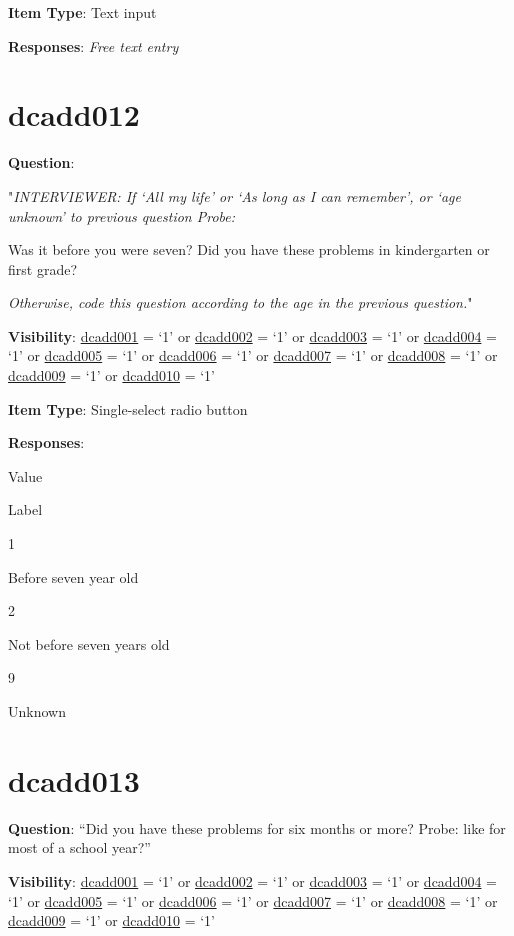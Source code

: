 \documentclass[]{book}
\begin{document}
\textbf{Item Type}: Text input

\textbf{Responses}: \emph{Free text entry}

\hypertarget{dcadd012}{%
\section{dcadd012}\label{dcadd012}}

\textbf{Question}:

"\emph{INTERVIEWER: If `All my life' or `As long as I can remember', or `age unknown' to previous question Probe:}

Was it before you were seven? Did you have these problems in kindergarten or first grade?

\emph{Otherwise, code this question according to the age in the previous question.}"

\textbf{Visibility}: \protect\hyperlink{dcadd001}{dcadd001} = `1' or \protect\hyperlink{dcadd002}{dcadd002} = `1' or \protect\hyperlink{dcadd003}{dcadd003} = `1' or \protect\hyperlink{dcadd004}{dcadd004} = `1' or \protect\hyperlink{dcadd005}{dcadd005} = `1' or \protect\hyperlink{dcadd006}{dcadd006} = `1' or \protect\hyperlink{dcadd007}{dcadd007} = `1' or \protect\hyperlink{dcadd008}{dcadd008} = `1' or \protect\hyperlink{dcadd009}{dcadd009} = `1' or \protect\hyperlink{dcadd010}{dcadd010} = `1'

\textbf{Item Type}: Single-select radio button

\textbf{Responses}:

Value

Label

1

Before seven year old

2

Not before seven years old

9

Unknown

\hypertarget{dcadd013}{%
\section{dcadd013}\label{dcadd013}}

\textbf{Question}: ``Did you have these problems for six months or more? Probe: like for most of a school year?''

\textbf{Visibility}: \protect\hyperlink{dcadd001}{dcadd001} = `1' or \protect\hyperlink{dcadd002}{dcadd002} = `1' or \protect\hyperlink{dcadd003}{dcadd003} = `1' or \protect\hyperlink{dcadd004}{dcadd004} = `1' or \protect\hyperlink{dcadd005}{dcadd005} = `1' or \protect\hyperlink{dcadd006}{dcadd006} = `1' or \protect\hyperlink{dcadd007}{dcadd007} = `1' or \protect\hyperlink{dcadd008}{dcadd008} = `1' or \protect\hyperlink{dcadd009}{dcadd009} = `1' or \protect\hyperlink{dcadd010}{dcadd010} = `1'
\end{document}
